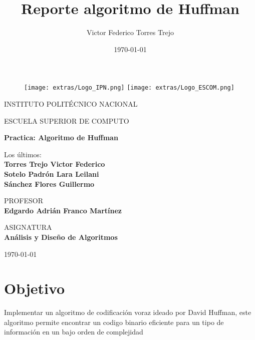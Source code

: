\documentclass[12 pt]{report}
\title{Reporte algoritmo de Huffman}
\author{Victor Federico Torres Trejo}
\date{\today}
\begin{document}
\thispagestyle{empty}

\begin{figure}[ht]
  \texttt{[image: extras/Logo\_IPN.png]}
  \label{EscudoIPN}
  \endminipage
  \texttt{[image: extras/Logo\_ESCOM.png]}
  \label{EscudoESCOM}
  \endminipage
\end{figure}

\begin{center}
  \vspace{0.8cm}
  \LARGE
  INSTITUTO POLITÉCNICO NACIONAL
  
  \vspace{0.8cm}
  \LARGE
  ESCUELA SUPERIOR DE COMPUTO
  
  \vspace{1.5cm}	
  \Large
  \textbf{Practica: Algoritmo de Huffman}

  \vspace{1.0cm}
  \normalsize	
  Los últimos:  \\
  \vspace{.3cm}
  \large
  \textbf{Torres Trejo Victor Federico \\ Sotelo Padrón Lara Leilani \\ Sánchez Flores Guillermo}
  
  \vspace{1cm}
  \normalsize	
  PROFESOR \\
  \vspace{.3cm}
  \large
  \textbf{Edgardo Adrián Franco Martínez}
  
  \vspace{1cm}
  \normalsize
  
  \vspace{1cm}
  \normalsize	
  ASIGNATURA \\
  \vspace{.3cm}
  \large
  \textbf{Análisis y Diseño de Algoritmos}
\end{center}


\vspace{1cm}
\today



\section*{Objetivo}
Implementar un algoritmo de codificación voraz ideado por David Huffman, este algoritmo permite encontrar un codigo binario eficiente para un tipo de información en un bajo orden de complejidad
\end{document}

